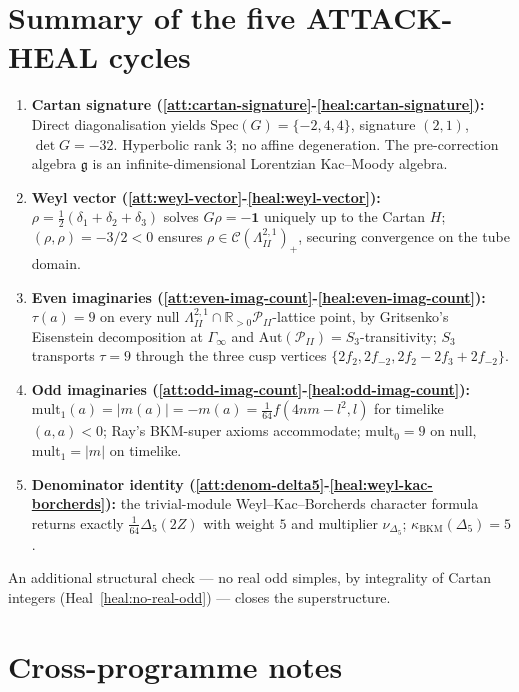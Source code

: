 \documentclass[11pt]{article}
\theoremstyle{definition}
\providecommand{\R}{\mathbb{R}}
\providecommand{\g}{\mathfrak{g}}
\providecommand{\Aut}{\mathrm{Aut}}
\providecommand{\mult}{\mathrm{mult}}
\providecommand{\LII}{\Lambda^{2,1}_{I\!I}}
\providecommand{\PII}{\mathcal{P}_{I\!I}}
\providecommand{\CII}{\mathcal{C}(\LII)_+}
\providecommand{\kBKM}{\kappa_{\mathrm{BKM}}}
\providecommand{\Deltafive}{\Delta_5}
\begin{document}
\section{Summary of the five ATTACK-HEAL cycles}

\begin{enumerate}
\item \textbf{Cartan signature (\ref{att:cartan-signature}-\ref{heal:cartan-signature}):}
      Direct diagonalisation yields $\mathrm{Spec}(G)=\{-2,4,4\}$,
      signature $(2,1)$, $\det G=-32$. Hyperbolic rank $3$; no affine
      degeneration. The pre-correction algebra $\g$ is an
      infinite-dimensional Lorentzian Kac--Moody algebra.
\item \textbf{Weyl vector (\ref{att:weyl-vector}-\ref{heal:weyl-vector}):}
      $\rho=\tfrac12(\delta_1+\delta_2+\delta_3)$ solves $G\rho=-\mathbf 1$
      uniquely up to the Cartan $H$; $(\rho,\rho)=-3/2<0$ ensures
      $\rho\in\CII$, securing convergence on the tube domain.
\item \textbf{Even imaginaries (\ref{att:even-imag-count}-\ref{heal:even-imag-count}):}
      $\tau(a)=9$ on every null $\LII\cap\R_{>0}\PII$-lattice point, by
      Gritsenko's Eisenstein decomposition at $\Gamma_\infty$ and
      $\Aut(\PII)=S_3$-transitivity; $S_3$ transports $\tau=9$
      through the three cusp vertices $\{2f_2, 2f_{-2}, 2f_2-2f_3+2f_{-2}\}$.
\item \textbf{Odd imaginaries (\ref{att:odd-imag-count}-\ref{heal:odd-imag-count}):}
      $\mult_1(a)=|m(a)|=-m(a)=\tfrac{1}{64}f(4nm-l^2,l)$ for timelike
      $(a,a)<0$; Ray's BKM-super axioms accommodate; $\mult_0=9$ on null,
      $\mult_1=|m|$ on timelike.
\item \textbf{Denominator identity (\ref{att:denom-delta5}-\ref{heal:weyl-kac-borcherds}):}
      the trivial-module Weyl--Kac--Borcherds character formula returns
      exactly $\tfrac{1}{64}\Deltafive(2Z)$ with weight $5$ and
      multiplier $\nu_{\Deltafive}$; $\kBKM(\Deltafive)=5$.
\end{enumerate}

An additional structural check --- no real odd simples, by
integrality of Cartan integers (Heal~\ref{heal:no-real-odd}) --- closes
the superstructure.

\section*{Cross-programme notes}
\end{document}
